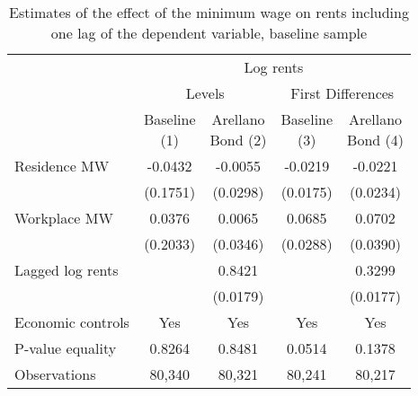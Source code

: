 \begin{table}[hbt!]
    \centering
    \caption{Estimates of the effect of the minimum wage on rents including one lag of the
             dependent variable, baseline sample}
    \label{tab:arellano_bond}

    \begin{tabular}{@{}lcccc@{}}
        \toprule
                                             & \multicolumn{4}{c}{Log rents}                                                       \\ \cmidrule(lr){2-5} 
                                             & \multicolumn{2}{c}{Levels}               & \multicolumn{2}{c}{First Differences}    \\ \cmidrule(lr){2-3}\cmidrule(lr){4-5} 
        \multicolumn{1}{c}{}                 & \shortstack{Baseline\\(1)} 
                                             & \shortstack{Arellano\\Bond (2)} 
                                             & \shortstack{Baseline\\(3)} 
                                             & \shortstack{Arellano\\Bond (4)}                                                     \\ \midrule
        Residence MW                         & -0.0432                  & -0.0055               & -0.0219                  & -0.0221               \\
                                             & (0.1751)                & (0.0298)             & (0.0175)                & (0.0234)             \\
        Workplace MW                         & 0.0376                  & 0.0065               & 0.0685                  & 0.0702               \\
                                             & (0.2033)                & (0.0346)             & (0.0288)                & (0.0390)             \\
        Lagged log rents                     &                      & 0.8421               &                      & 0.3299               \\
                                             &                      & (0.0179)             &                      & (0.0177)             \\ \midrule
        Economic controls                    & Yes                  & Yes               & Yes                  & Yes               \\
        P-value equality                     & 0.8264                  & 0.8481               & 0.0514                  & 0.1378               \\
        Observations                         & 80,340                 & 80,321              & 80,241                 & 80,217              \\ \bottomrule


\end{tabular}
\end{table}
